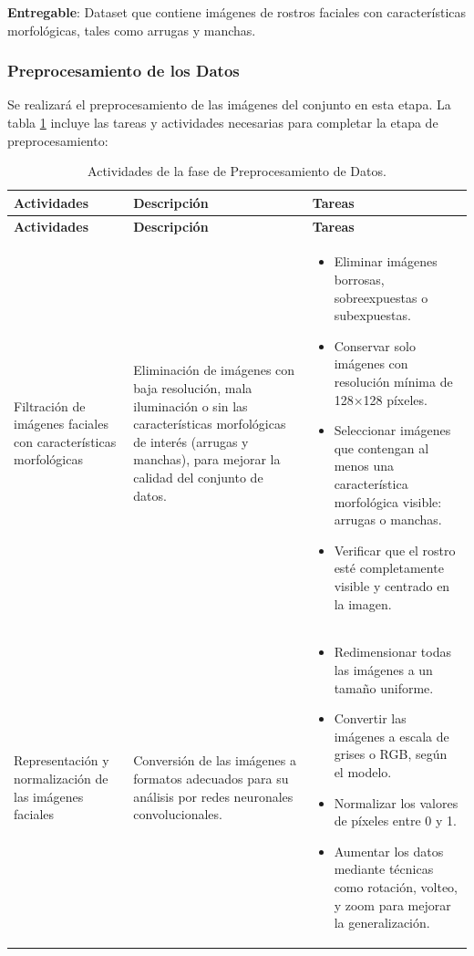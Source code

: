 \textbf{Entregable}: Dataset que contiene imágenes de rostros faciales con características morfológicas, tales como arrugas y manchas.

\subsubsection{Preprocesamiento de los Datos}
Se realizará el preprocesamiento de las imágenes del conjunto en esta etapa. La tabla \ref{tabla:preprocesamiento} incluye las tareas y actividades necesarias para completar la etapa de preprocesamiento:
\vspace{2ex}


\begin{longtable}{>{\raggedright\arraybackslash}p{4cm} >{\raggedright\arraybackslash}p{4cm} >{\raggedright\arraybackslash}p{5cm}}
    \caption{Actividades de la fase de Preprocesamiento de Datos.}
    \label{tabla:preprocesamiento}\\
    \toprule
    \textbf{Actividades} & \textbf{Descripción} & \textbf{Tareas} \\
    \midrule
    \endfirsthead

    \toprule
    \textbf{Actividades} & \textbf{Descripción} & \textbf{Tareas} \\
    \midrule
    \endhead

    \bottomrule
    \endfoot

    \bottomrule
    \endlastfoot

    Filtración de imágenes faciales con características morfológicas & Eliminación de imágenes con baja resolución, mala iluminación o sin las características morfológicas de interés (arrugas y manchas), para mejorar la calidad del conjunto de datos. & 
    \begin{itemize}
        \item Eliminar imágenes borrosas, sobreexpuestas o subexpuestas.
        \item Conservar solo imágenes con resolución mínima de 128×128 píxeles.
        \item Seleccionar imágenes que contengan al menos una característica morfológica visible: arrugas o manchas.
        \item Verificar que el rostro esté completamente visible y centrado en la imagen.
    \end{itemize} \\

    Representación y normalización de las imágenes faciales & Conversión de las imágenes a formatos adecuados para su análisis por redes neuronales convolucionales. & 
    \begin{itemize}
        \item Redimensionar todas las imágenes a un tamaño uniforme.
        \item Convertir las imágenes a escala de grises o RGB, según el modelo.
        \item Normalizar los valores de píxeles entre 0 y 1.
        \item Aumentar los datos mediante técnicas como rotación, volteo, y zoom para mejorar la generalización.
    \end{itemize} \\


\end{longtable}
